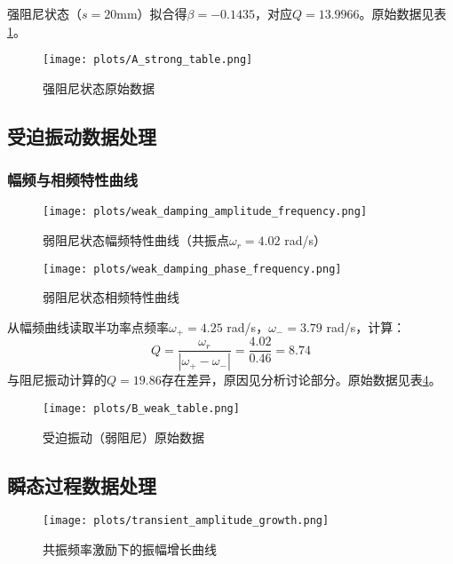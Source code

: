 \documentclass[UTF8]{ctexart}
\begin{document}
强阻尼状态（$s=20$mm）拟合得$\beta = -0.1435$，对应$Q=13.9966$。原始数据见表\ref{tab:A_strong}。

\begin{figure}[H]
    \centering
    \texttt{[image: plots/A\_strong\_table.png]}
    \caption{强阻尼状态原始数据}
    \label{tab:A_strong}
\end{figure}

\subsection{受迫振动数据处理}

\subsubsection{幅频与相频特性曲线}
\begin{figure}[H]
    \centering
    \texttt{[image: plots/weak\_damping\_amplitude\_frequency.png]}
    \caption{弱阻尼状态幅频特性曲线（共振点$\omega_r=4.02$ rad/s）}
    \label{fig:weak_amp_freq}
\end{figure}

\begin{figure}[H]
    \centering
    \texttt{[image: plots/weak\_damping\_phase\_frequency.png]}
    \caption{弱阻尼状态相频特性曲线}
    \label{fig:weak_phase_freq}
\end{figure}

从幅频曲线读取半功率点频率$\omega_+=4.25$ rad/s，$\omega_-=3.79$ rad/s，计算：
\[
Q = \frac{\omega_r}{|\omega_+ - \omega_-|} = \frac{4.02}{0.46} = 8.74
\]
与阻尼振动计算的$Q=19.86$存在差异，原因见分析讨论部分。原始数据见表\ref{tab:B_weak}。

\begin{figure}[H]
    \centering
    \texttt{[image: plots/B\_weak\_table.png]}
    \caption{受迫振动（弱阻尼）原始数据}
    \label{tab:B_weak}
\end{figure}

\subsection{瞬态过程数据处理}
\begin{figure}[H]
    \centering
    \texttt{[image: plots/transient\_amplitude\_growth.png]}
    \caption{共振频率激励下的振幅增长曲线}
    \label{fig:transient}
\end{figure}
\end{document}
